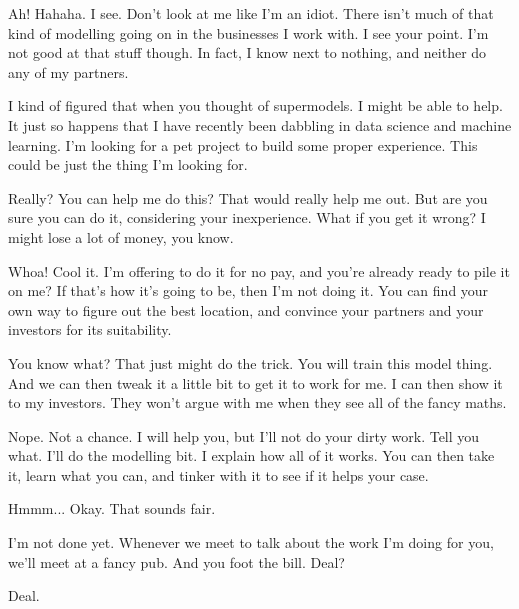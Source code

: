 {\color{blue} Ah! Hahaha. I see. Don't look at me like I'm an idiot. There isn't much of that kind of modelling going on in the businesses I work with. I see your point. I'm not good at that stuff though. In fact, I know next to nothing, and neither do any of my partners.}

I kind of figured that when you thought of supermodels. I might be able to help. It just so happens that I have recently been dabbling in data science and machine learning. I'm looking for a pet project to build some proper experience. This could be just the thing I'm looking for. 

{\color{blue} Really? You can help me do this? That would really help me out. But are you sure you can do it, considering your inexperience. What if you get it wrong? I might lose a lot of money, you know.}

Whoa! Cool it. I'm offering to do it for no pay, and you're already ready to pile it on me? If that's how it's going to be, then I'm not doing it. You can find your own way to figure out the best location, and convince your partners and your investors for its suitability. 

{\color{blue} You know what? That just might do the trick. You will train this model thing. And we can then tweak it a little bit to get it to work for me. I can then show it to my investors. They won't argue with me when they see all of the fancy maths.}

Nope. Not a chance. I will help you, but I'll not do your dirty work. Tell you what. I'll do the modelling bit. I explain how all of it works. You can then take it, learn what you can, and tinker with it to see if it helps your case. 

{\color{blue} Hmmm... Okay. That sounds fair.}

I'm not done yet. Whenever we meet to talk about the work I'm doing for you, we'll meet at a fancy pub. And you foot the bill. Deal?

{\color{blue} Deal.}
